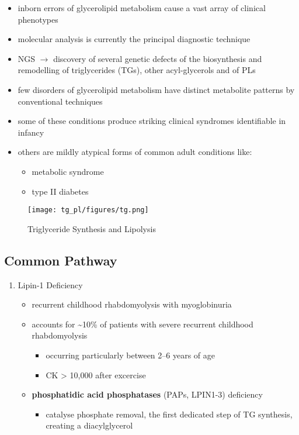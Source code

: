 \documentclass[12pt]{scrartcl}
\begin{document}
\begin{itemize}
\item inborn errors of glycerolipid metabolism cause a vast array of
clinical phenotypes
\item molecular analysis is currently the principal diagnostic
technique
\item NGS \(\to\) discovery of several genetic defects of the biosynthesis and
remodelling of triglycerides (TGs), other acyl-glycerols and of PLs
\item few disorders of glycerolipid metabolism have distinct metabolite
patterns by conventional techniques
\item some of these conditions produce striking clinical syndromes
identifiable in infancy
\item others are mildly atypical forms of common adult conditions like:
\begin{itemize}
\item metabolic syndrome
\item type II diabetes
\end{itemize}
\end{itemize}

\begin{figure}[htbp]
\centering
\texttt{[image: tg\_pl/figures/tg.png]}
\caption{\label{fig:org0b2a182}Triglyceride Synthesis and Lipolysis}
\end{figure}

\subsection{Common Pathway}
\label{sec:orgec4ecc8}
\begin{enumerate}
\item Lipin-1 Deficiency
\label{sec:orgc3c1a7c}
\begin{itemize}
\item recurrent childhood rhabdomyolysis with myoglobinuria
\item accounts for \textasciitilde{}10\% of patients with severe recurrent childhood
rhabdomyolysis
\begin{itemize}
\item occurring particularly between 2–6 years of age
\item CK \textgreater{} 10,000 after excercise
\end{itemize}
\item \textbf{phosphatidic acid phosphatases} (PAPs, LPIN1-3) deficiency
\begin{itemize}
\item catalyse phosphate removal, the first dedicated step of TG
synthesis, creating a diacylglycerol
\end{itemize}
\end{itemize}
\end{enumerate}
\end{document}
